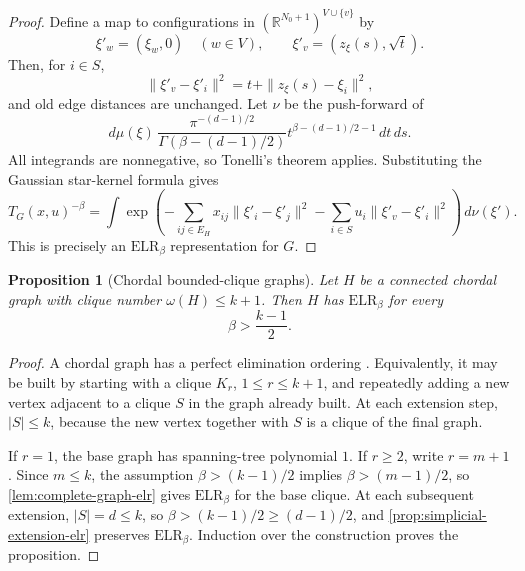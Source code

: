 \documentclass[preprint,12pt,authoryear]{elsarticle}
\numberwithin{equation}{section}
\newtheorem{proposition}[theorem]{Proposition}
\theoremstyle{definition}
\theoremstyle{remark}
\newcommand{\R}{\mathbb{R}}
\newcommand{\1}{\mathbf{1}}
\newcommand{\ELR}{\mathrm{ELR}}
\begin{document}
\begin{proof}
Define a map to configurations in \((\R^{N_0+1})^{V\cup\{v\}}\) by
\begin{equation}
        \xi'_w=(\xi_w,0)\quad (w\in V),
        \qquad
        \xi'_v=(z_{\xi}(s),\sqrt t).
\end{equation}
Then, for \(i\in S\),
\begin{equation}
        \|\xi'_v-\xi'_i\|^2=t+\|z_{\xi}(s)-\xi_i\|^2,
\end{equation}
and old edge distances are unchanged.  Let \(\nu\) be the push-forward of
\begin{equation}
        d\mu(\xi)\,
        \frac{\pi^{-(d-1)/2}}{\Gamma(\beta-(d-1)/2)}
        t^{\beta-(d-1)/2-1}\,dt\,ds .
\end{equation}
All integrands are nonnegative, so Tonelli's theorem applies.  Substituting the Gaussian star-kernel formula gives
\begin{equation}
        T_G(x,u)^{-\beta}
        =
        \int
        \exp\left(
        -\sum_{ij\in E_H}x_{ij}\|\xi'_i-\xi'_j\|^2
        -\sum_{i\in S}u_i\|\xi'_v-\xi'_i\|^2
        \right)\,d\nu(\xi').
\end{equation}
This is precisely an \(\ELR_\beta\) representation for \(G\).
\end{proof}

\begin{proposition}[Chordal bounded-clique graphs]
\label{prop:chordal-elr}
Let \(H\) be a connected chordal graph with clique number \(\omega(H)\le k+1\).  Then \(H\) has \(\ELR_\beta\) for every
\begin{equation}
        \beta>\frac{k-1}{2}.
\end{equation}
\end{proposition}

\begin{proof}
A chordal graph has a perfect elimination ordering \cite{FulkersonGross1965}.  Equivalently, it may be built by starting with a clique \(K_r\), \(1\le r\le k+1\), and repeatedly adding a new vertex adjacent to a clique \(S\) in the graph already built.  At each extension step, \(|S|\le k\), because the new vertex together with \(S\) is a clique of the final graph.

If \(r=1\), the base graph has spanning-tree polynomial \(1\).  If \(r\ge2\), write \(r=m+1\).  Since \(m\le k\), the assumption \(\beta>(k-1)/2\) implies \(\beta>(m-1)/2\), so \cref{lem:complete-graph-elr} gives \(\ELR_\beta\) for the base clique.  At each subsequent extension, \(|S|=d\le k\), so \(\beta>(k-1)/2\ge(d-1)/2\), and \cref{prop:simplicial-extension-elr} preserves \(\ELR_\beta\).  Induction over the construction proves the proposition.
\end{proof}
\end{document}
